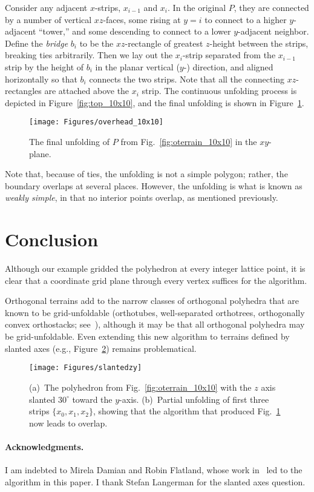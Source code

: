 \pdfoutput=1  \documentclass[]{article}
\newcommand{\figlab}[1]{\label{fig:#1}}
\newcommand{\figref}[1]{\ref{fig:#1}}
\begin{document}
Consider any adjacent $x$-strips, $x_{i-1}$ and $x_i$.
In the original $P$, they are connected by a number of vertical $xz$-faces,
some rising at $y{=}i$ to connect to a higher $y$-adjacent ``tower,'' 
and some descending to connect to a lower $y$-adjacent neighbor.
Define the \emph{bridge} $b_i$ to be the $xz$-rectangle of greatest $z$-height
between the strips,
breaking ties arbitrarily.  Then we lay out the $x_i$-strip 
separated from the $x_{i-1}$ strip 
by the height of $b_i$ in the planar vertical ($y$-) direction, 
and 
aligned horizontally so that $b_i$ connects the two strips.
Note that all the connecting $xz$-rectangles are attached above
the $x_i$ strip.
The continuous unfolding process is depicted in 
Figure~\figref{top_10x10},
and the final unfolding is shown in 
Figure~\figref{overhead_10x10}.
\begin{figure}[htbp]
\centering
\texttt{[image: Figures/overhead\_10x10]}
\caption{The final unfolding of $P$ from Fig.~\protect\figref{oterrain_10x10} in
the $xy$-plane.}
\figlab{overhead_10x10}
\end{figure}
Note that, because of ties, the unfolding is not a simple polygon;
rather, the boundary overlaps at several places.
However, the unfolding is what is known as \emph{weakly simple}, in
that no interior points overlap, as mentioned previously.

\section{Conclusion}

Although our example gridded the polyhedron at every integer lattice point,
it is clear that a coordinate grid plane through every vertex suffices for the
algorithm.

Orthogonal terrains add to the narrow classes of orthogonal polyhedra
that are known to be grid-unfoldable
(orthotubes, 
well-separated orthotrees,
orthogonally convex orthostacks; see~\cite{o-uop-07}),
although
it may be that all orthogonal polyhedra may be grid-unfoldable.
Even extending this new algorithm to terrains defined by slanted axes
(e.g., Figure~\figref{slantedzy})
remains problematical.
\begin{figure}[htbp]
\centering
\texttt{[image: Figures/slantedzy]}
\caption{(a)~The polyhedron from Fig.~\protect\figref{oterrain_10x10}
with the $z$ axis slanted $30^\circ$ toward the $y$-axis.
(b)~Partial unfolding of first three strips 
$\{x_0,x_1,x_2\}$, showing that the algorithm 
that produced Fig.~\protect\figref{overhead_10x10}
now leads to overlap.
}
\figlab{slantedzy}
\end{figure}


\paragraph{Acknowledgments.}
I am indebted to
Mirela Damian and Robin Flatland, whose work in~\cite{dfo-umt-05}
led to the algorithm in this paper.
I thank Stefan Langerman for the slanted axes question.





\end{document}
